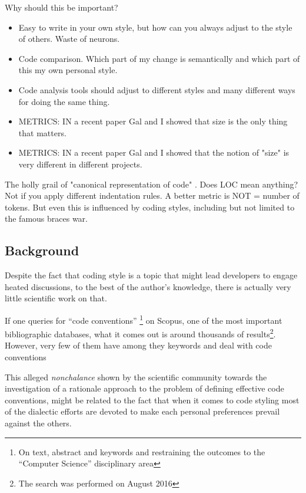 Why should this be important?
\begin{itemize}
    \item Easy to write in your own style, but how can
      you always adjust to the style of others.
      Waste of neurons.
    \item Code comparison. Which part of my change is semantically and which
      part of this my own personal style.
    \item Code analysis tools should adjust to different styles and many
        different ways for doing the same thing.
    \item METRICS: IN a recent paper Gal and I showed that size
      is the only thing that matters.
    \item METRICS: IN a recent paper Gal and I showed that the notion of
      "size" is very different in different projects.
\end{itemize}

The holly grail of "canonical representation of code" .
Does LOC mean anything?
Not if you apply different indentation rules.
A better metric is NOT = number of tokens.
But even this is influenced by coding styles, including but
not limited to the famous braces war.

\subsection{Background}

Despite the fact that coding style is a topic that might lead developers to engage heated 
discussions, to the best of the author's knowledge, there is actually very little scientific 
work on that. 

If one queries for ``code conventions''
\footnote{On text, abstract and keywords and restraining the outcomes to the ``Computer Science''
disciplinary area} 
on Scopus, one of the most important bibliographic databases, what it comes out is around 
thousands of results\footnote{The search was performed on August 2016}. 
However, very few of them  have  among they
keywords and deal with code conventions

This alleged \emph{nonchalance} shown by the scientific community towards the investigation 
of a rationale approach to the problem of defining effective code conventions, might be 
related to the fact that when it comes to code styling most of the dialectic efforts are devoted
to make each personal preferences prevail against the others.

